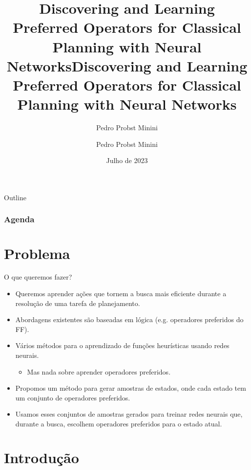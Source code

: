 \documentclass{beamer}
\title[Discovering and Learning Preferred Operators]{Discovering and Learning Preferred Operators for Classical Planning with Neural Networks}
\author{Pedro Probst Minini}
\title[Discovering and Learning Preferred Operators]
      {Discovering and Learning Preferred Operators for Classical Planning with Neural Networks}
\date{Julho de 2023}
\author{Pedro Probst Minini}
\institute{Instituto de Informática --- UFRGS}
\begin{document}

\begin{frame}[plain]
  \titlepage
\end{frame}

\begin{frame}{Outline}
  \frametitle{Agenda}
  \tableofcontents
\end{frame}

\section{Problema}
\begin{frame}{O que queremos fazer?}
\begin{itemize}
  \item Queremos aprender \alert{ações} que tornem a busca mais \alert{eficiente} durante a resolução de uma tarefa de planejamento.
  \pause
  \item Abordagens existentes são baseadas em lógica (e.g. operadores preferidos do FF).
  \pause
  \item Vários métodos para o aprendizado de funções heurísticas usando redes neurais.
  \begin{itemize}
    \item Mas nada sobre aprender operadores preferidos.
  \end{itemize}
  \pause
  \item Propomos um método para gerar amostras de estados, onde \alert{cada estado tem um conjunto de operadores preferidos}.
  \pause
  \item Usamos esses conjuntos de amostras gerados para \alert{treinar redes neurais} que, durante a busca, escolhem operadores preferidos para o estado atual.
\end{itemize}
\end{frame}

\section{Introdução}
\end{document}
